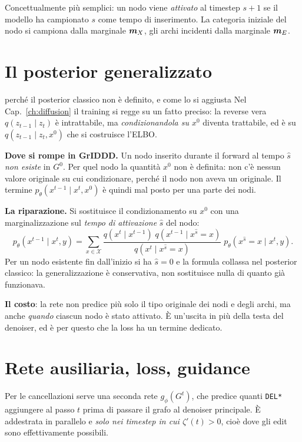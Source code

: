 Concettualmente più semplici: un nodo viene \emph{attivato} al timestep $s+1$ se il modello ha campionato $s$ come tempo di inserimento. La categoria iniziale del nodo si campiona dalla marginale $\bm{m}_X$, gli archi incidenti dalla marginale $\bm{m}_E$.

\section{Il posterior generalizzato}

\begin{esempiosvolto}{perché il posterior classico non è definito, e come lo si aggiusta}
Nel Cap.~\ref{ch:diffusion} il training si regge su un fatto preciso: la reverse vera $q(z_{t-1} \mid z_t)$ è intrattabile, ma \emph{condizionandola su $x^0$} diventa trattabile, ed è su $q(z_{t-1} \mid z_t, x^0)$ che si costruisce l'ELBO.

\textbf{Dove si rompe in GrIDDD.} Un nodo inserito durante il forward al tempo $\hat s$ \emph{non esiste} in $G^0$. Per quel nodo la quantità $x^0$ non è definita: non c'è nessun valore originale su cui condizionare, perché il nodo non aveva un originale. Il termine $p_\theta(x^{t-1} \mid x^t, x^0)$ è quindi mal posto per una parte dei nodi.

\textbf{La riparazione.} Si sostituisce il condizionamento su $x^0$ con una marginalizzazione sul \emph{tempo di attivazione} $\hat s$ del nodo:
\[
p_\theta(x^{t-1} \mid x^t, y) = \sum_{x \in \mathcal{X}} \frac{q(x^t \mid x^{t-1})\; q(x^{t-1} \mid x^{\hat s} = x)}{q(x^t \mid x^{\hat s} = x)}\; p_\theta(x^{\hat s} = x \mid x^t, y).
\]
Per un nodo esistente fin dall'inizio si ha $\hat s = 0$ e la formula collassa nel posterior classico: la generalizzazione è conservativa, non sostituisce nulla di quanto già funzionava.

\textbf{Il costo}: la rete non predice più solo il tipo originale dei nodi e degli archi, ma anche \emph{quando} ciascun nodo è stato attivato. È un'uscita in più della testa del denoiser, ed è per questo che la loss ha un termine dedicato.
\end{esempiosvolto}

\section{Rete ausiliaria, loss, guidance}

Per le cancellazioni serve una seconda rete $g_\phi(G^t)$, che predice quanti \texttt{DEL*} aggiungere al passo $t$ prima di passare il grafo al denoiser principale. È addestrata in parallelo e \emph{solo nei timestep in cui $\zeta'(t) > 0$}, cioè dove gli edit sono effettivamente possibili.

